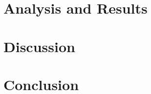 \documentclass[11pt]{article}
\begin{document}
    \section{Analysis and Results}\label{sec:analysis}

    \section{Discussion}\label{sec:discussion}

    \section{Conclusion}\label{sec:conclusion}
\end{document}
